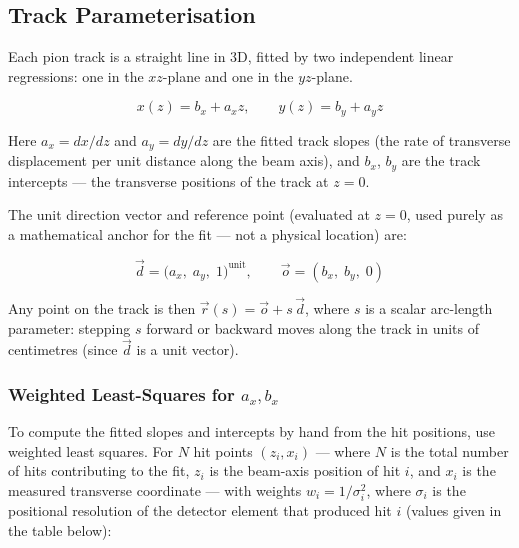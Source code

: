 
\subsection{Track Parameterisation}

Each pion track is a straight line in 3D, fitted by two independent
linear regressions: one in the $xz$-plane and one in the $yz$-plane.

\begin{equation}
    x(z) = b_x + a_x z, \qquad y(z) = b_y + a_y z
\end{equation}

\noindent
Here $a_x = dx/dz$ and $a_y = dy/dz$ are the fitted track slopes (the rate of transverse displacement per unit distance along the beam axis), and $b_x$, $b_y$ are the track intercepts --- the transverse positions of the track at $z = 0$.

The unit direction vector and reference point (evaluated at $z = 0$, used purely as a mathematical anchor for the fit --- not a physical location) are:

\begin{equation}
    \vec{d} = \bigl(a_x,\; a_y,\; 1\bigr)^{\!\text{unit}}, \qquad
    \vec{o} = (b_x,\; b_y,\; 0)
\end{equation}

Any point on the track is then $\vec{r}(s) = \vec{o} + s\,\vec{d}$, where $s$ is a scalar arc-length parameter: stepping $s$ forward or backward moves along the track in units of centimetres (since $\vec{d}$ is a unit vector).

\subsubsection{Weighted Least-Squares for \texorpdfstring{$a_x, b_x$}{ax, bx}}

To compute the fitted slopes and intercepts by hand from the hit positions,
use weighted least squares. For $N$ hit points $(z_i, x_i)$ --- where $N$ is the total number of hits contributing to the fit, $z_i$ is the beam-axis position of hit $i$, and $x_i$ is the measured transverse coordinate --- with weights $w_i = 1/\sigma_i^2$, where $\sigma_i$ is the positional resolution of the detector element that produced hit $i$ (values given in the table below):

